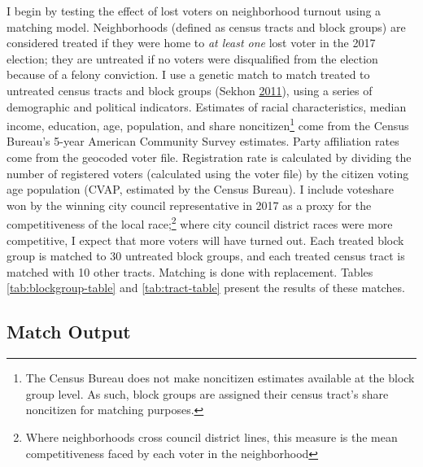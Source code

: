 \documentclass[12pt,]{article}
\let\rmarkdownfootnote\footnote%
\def\footnote{\protect\rmarkdownfootnote}
\begin{document}
I begin by testing the effect of lost voters on neighborhood turnout using a matching model. Neighborhoods (defined as census tracts and block groups) are considered treated if they were home to \emph{at least one} lost voter in the 2017 election; they are untreated if no voters were disqualified from the election because of a felony conviction. I use a genetic match to match treated to untreated census tracts and block groups (Sekhon \protect\hyperlink{ref-Sekhon2011}{2011}), using a series of demographic and political indicators. Estimates of racial characteristics, median income, education, age, population, and share noncitizen\footnote{The Census Bureau does not make noncitizen estimates available at the block group level. As such, block groups are assigned their census tract's share noncitizen for matching purposes.} come from the Census Bureau's 5-year American Community Survey estimates. Party affiliation rates come from the geocoded voter file. Registration rate is calculated by dividing the number of registered voters (calculated using the voter file) by the citizen voting age population (CVAP, estimated by the Census Bureau). I include voteshare won by the winning city council representative in 2017 as a proxy for the competitiveness of the local race;\footnote{Where neighborhoods cross council district lines, this measure is the mean competitiveness faced by each voter in the neighborhood} where city council district races were more competitive, I expect that more voters will have turned out. Each treated block group is matched to 30 untreated block groups, and each treated census tract is matched with 10 other tracts. Matching is done with replacement. Tables \ref{tab:blockgroup-table} and \ref{tab:tract-table} present the results of these matches.

\hypertarget{match-output}{%
\subsection*{Match Output}\label{match-output}}
\end{document}
